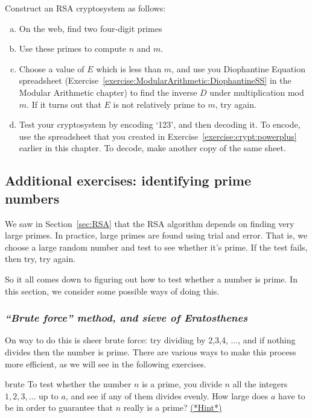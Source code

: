  
\begin{exercise}{}
Construct an RSA cryptosystem as follows:
\begin{enumerate}[(a)]
\item
On the web, find two four-digit primes
\item
Use these primes to compute $n$ and $m$.
\item
Choose a value of $E$ which is less than $m$, and use you Diophantine Equation spreadsheet (Exercise~\ref{exercise:ModularArithmetic:DiophantineSS} in the Modular Arithmetic chapter) to find the inverse $D$ under multiplication mod $m$.  If it turns out that $E$ is not relatively prime to $m$, try again.
\item
Test your cryptosystem by encoding `123', and then decoding it. To encode, use the spreadsheet that you 
created in Exercise~\ref{exercise:crypt:powerplus} earlier in this chapter. To decode, make another copy of the same sheet.
\end{enumerate}
\end{exercise} 
 
 
\subsection{Additional exercises: identifying prime numbers\quad
{}}\label{primality}
 
We saw in Section~\ref{sec:RSA} that the RSA algorithm depends on finding very large primes. In practice, large primes are found using trial and error. That is, we choose a large random number and test to see whether it's prime. 
If the test fails, then try, try again.

So it all comes down to figuring out how to test whether a number is prime. In this section, we consider some possible ways of doing this.

\subsubsection*{\emph{``Brute force'' method, and sieve of Eratosthenes}}
On way to do this is sheer brute force: try dividing by 2,3,4, $\ldots$, and if nothing divides then the number is prime. There are various ways to make this process more efficient, as we will see in the following exercises.

\begin{exercise}{brute}
To test whether the number $n$ is a prime, you divide $n$ all the integers $1,2,3, \dots$ up to $a$, and see if any of them divides evenly.  How large does $a$ have to be in order to guarantee that $n$ really is a prime?
\hyperref[sec:crypt:hints]{(*Hint*)}
\end{exercise}

